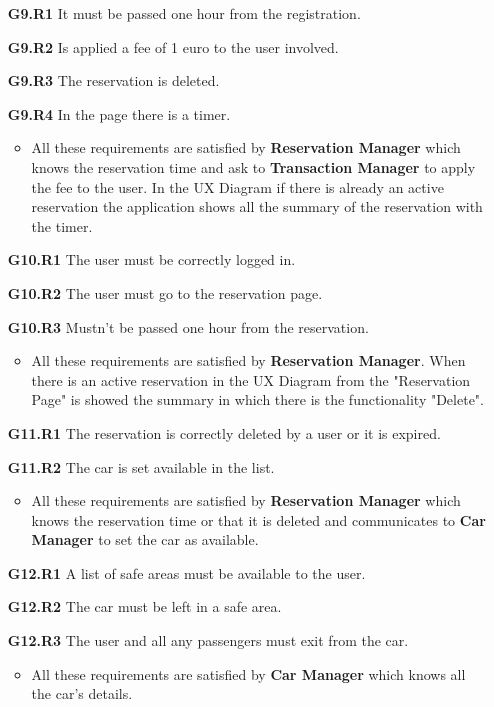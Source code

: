 \begin{itemize}
\item[\textbf{G9.R1}] It must be passed one hour from the registration.
\item[\textbf{G9.R2}] Is applied a fee of 1 euro to the user involved.
\item[\textbf{G9.R3}] The reservation is deleted.
\item[\textbf{G9.R4}] In the page there is a timer.
\begin{itemize}
\item All these requirements are satisfied by \textbf{Reservation Manager} which knows the reservation time and ask to \textbf{Transaction Manager} to apply the fee to the user. In the UX Diagram if there is already an active reservation the application shows all the summary of the reservation with the timer.
\end{itemize}

\item[\textbf{G10.R1}] The user must be correctly logged in.
\item[\textbf{G10.R2}] The user must go to the reservation page.
\item[\textbf{G10.R3}] Mustn't be passed one hour from the reservation.
\begin{itemize}
\item All these requirements are satisfied by \textbf{Reservation Manager}. When there is an active reservation in the UX Diagram from the "Reservation Page" is showed the summary in which there is the functionality "Delete".
\end{itemize}

\item[\textbf{G11.R1}] The reservation is correctly deleted by a user or it is expired. 
\item[\textbf{G11.R2}] The car is set available in the list.
\begin{itemize}
\item All these requirements are satisfied by \textbf{Reservation Manager} which knows the reservation time or that it is deleted and communicates to \textbf{Car Manager} to set the car as available.
\end{itemize}


\item[\textbf{G12.R1}] A list of safe areas must be available to the user.
\item[\textbf{G12.R2}] The car must be left in a safe area.
\item[\textbf{G12.R3}] The user and all any passengers must exit from the car.
\begin{itemize}
\item All these requirements are satisfied by \textbf{Car Manager} which knows all the car's details.
\end{itemize}



\end{itemize}
